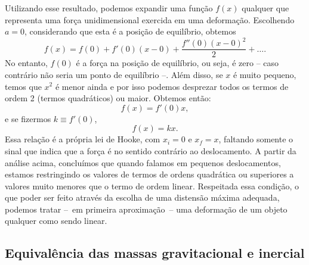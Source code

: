 Utilizando esse resultado, podemos expandir uma função $f(x)$ qualquer que representa uma força unidimensional exercida em uma deformação. Escolhendo $a=0$, considerando que esta é a posição de equilíbrio, obtemos
\begin{equation}
	f(x) = f(0) + f'(0) (x-0) + \frac{f''(0)(x-0)^2}{2} + \dots.
\end{equation}
%
No entanto, $f(0)$ é a força na posição de equilíbrio, ou seja, é zero -- caso contrário não seria um ponto de equilíbrio --. Além disso, se $x$ é muito pequeno, temos que $x^2$ é menor ainda e por isso podemos desprezar todos os termos de ordem 2 (termos quadráticos) ou maior. Obtemos então:
\begin{equation}
	f(x) = f'(0)x,
\end{equation}
%
e se fizermos $k \equiv f'(0)$,
\begin{equation}
	f(x) = kx.
\end{equation}
%
Essa relação é a própria lei de Hooke, com $x_i = 0$ e $x_f = x$, faltando somente o sinal que indica que a força é no sentido contrário ao deslocamento. A partir da análise acima, concluímos que quando falamos em pequenos deslocamentos, estamos restringindo os valores de termos de ordens quadrática ou superiores a valores muito menores que o termo de ordem linear. Respeitada essa condição, o que poder ser feito através da escolha de uma distensão máxima adequada, podemos tratar --~em primeira aproximação~-- uma deformação de um objeto qualquer como sendo linear.



\subsection{Equivalência das massas gravitacional e inercial}

